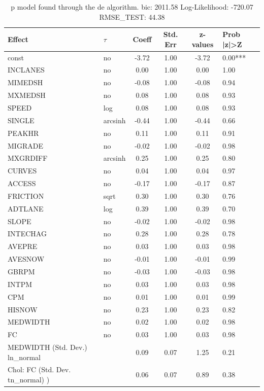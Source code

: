 \begin{table}
	\caption{p model found through the de algorithm. bic: 2011.58 Log-Likelihood: -720.07 RMSE_TEST: 44.38}
	\begin{center}
		\begin{tabular}{|l|l|c|c|c|l|}
			\hline
			Effect & $\tau$ & Coeff & Std. Err & z-values & Prob |z|>Z \\
			\hline
			const & no & -3.72 & 1.00 & -3.72 & 0.00*** \\
			\hline
			INCLANES & no & 0.00 & 1.00 & 0.00 & 1.00 \\
			\hline
			MIMEDSH & no & -0.08 & 1.00 & -0.08 & 0.94 \\
			\hline
			MXMEDSH & no & 0.08 & 1.00 & 0.08 & 0.93 \\
			\hline
			SPEED & log & 0.08 & 1.00 & 0.08 & 0.93 \\
			\hline
			SINGLE & arcsinh & -0.44 & 1.00 & -0.44 & 0.66 \\
			\hline
			PEAKHR & no & 0.11 & 1.00 & 0.11 & 0.91 \\
			\hline
			MIGRADE & no & -0.02 & 1.00 & -0.02 & 0.98 \\
			\hline
			MXGRDIFF & arcsinh & 0.25 & 1.00 & 0.25 & 0.80 \\
			\hline
			CURVES & no & 0.04 & 1.00 & 0.04 & 0.97 \\
			\hline
			ACCESS & no & -0.17 & 1.00 & -0.17 & 0.87 \\
			\hline
			FRICTION & sqrt & 0.30 & 1.00 & 0.30 & 0.76 \\
			\hline
			ADTLANE & log & 0.39 & 1.00 & 0.39 & 0.70 \\
			\hline
			SLOPE & no & -0.02 & 1.00 & -0.02 & 0.98 \\
			\hline
			INTECHAG & no & 0.28 & 1.00 & 0.28 & 0.78 \\
			\hline
			AVEPRE & no & 0.03 & 1.00 & 0.03 & 0.98 \\
			\hline
			AVESNOW & no & -0.01 & 1.00 & -0.01 & 0.99 \\
			\hline
			GBRPM & no & -0.03 & 1.00 & -0.03 & 0.98 \\
			\hline
			INTPM & no & 0.03 & 1.00 & 0.03 & 0.98 \\
			\hline
			CPM & no & 0.01 & 1.00 & 0.01 & 0.99 \\
			\hline
			HISNOW & no & 0.23 & 1.00 & 0.23 & 0.82 \\
			\hline
			MEDWIDTH & no & 0.02 & 1.00 & 0.02 & 0.98 \\
			\hline
			FC & no & 0.03 & 1.00 & 0.03 & 0.98 \\
			\hline
			MEDWIDTH (Std. Dev.) ln_normal &  & 0.09 & 0.07 & 1.25 & 0.21 \\
			\hline
			 Chol: FC (Std. Dev. tn_normal) ) &  & 0.06 & 0.07 & 0.89 & 0.38 \\
			\hline
		\end{tabular}
	\end{center}
\end{table}
